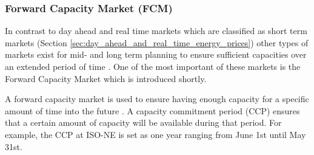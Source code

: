 %








\subsubsection{Forward Capacity Market (FCM)} 

In contrast to day ahead and real time markets which are classified as short term markets (Section \ref{sec:day_ahead_and_real_time_energy_prices}) other types of markets exist for mid- and long term planning to ensure sufficient capacities over an extended period of time \cite{barroso2005classification,nomikos2010modelling,redl2009price}. One of the most important of these markets is the Forward Capacity Market which is introduced shortly. 

A forward capacity market is used to ensure having enough capacity for a specific amount of time into the future \cite{gottstein2010role}. A capacity commitment period (CCP) ensures that a certain amount of capacity will be available during that period. For example, the CCP at ISO-NE is set as one year ranging from June 1st until May 31st. 

